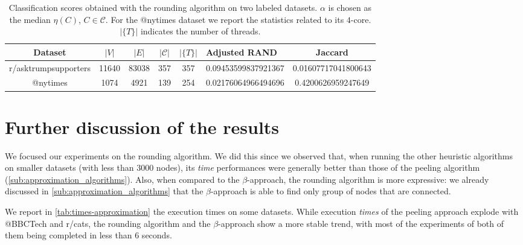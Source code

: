 \begin{table}
	\centering
	\caption{Classification scores obtained with the
		rounding algorithm on two labeled datasets. $\alpha $ is chosen as the
		median $\eta(C)$, $C \in
			\mathcal{C} $. For the @nytimes dataset we report the statistics
		related to its $4$-core. $|\{T\}|$ indicates the number of threads.}
	\label{tab:scores-datasets-labeled}
	{\small
		\begin{tabular}{|ccccc p{1.8cm} c|}
			\toprule
			Dataset              & $|V|$         & $|E|$                     & $|\mathcal{C}| $          &
			$|\{T\}| $           & Adjusted RAND & Jaccard                                                                                                            \\
			\midrule
			r/asktrumpsupporters & 11640         & 83038                     & 357
			                     & 357           & \num{0.09453599837921367} & \num{0.01607717041800643}                                                              \\
			@nytimes             & 1074          & 4921                      & 139                       & 254 & \num{0.02176064966494696} & \num{0.4200626959247649} \\
			\bottomrule
		\end{tabular}
	}
\end{table}

\section{Further discussion of the results}%
\label{sec:discussion}

We focused our experiments on the rounding algorithm. We did this
since we observed that, when running the other heuristic algorithms on smaller datasets
(with less than $3000$ nodes), its \emph{time} performances were generally better
than those of the peeling algorithm (\autoref{sub:approximation_algorithms}).
Also, when compared to the $\beta$-approach, the rounding algorithm is more
expressive: we already discussed in \autoref{sub:approximation_algorithms} that
the $\beta$-approach is able to find only group of nodes that are connected.

We report in \autoref{tab:times-approximation} the execution times on some
datasets. While execution \emph{times} of the peeling approach explode with
@BBCTech and r/cats, the rounding algorithm and the $\beta $-approach show a
more stable trend, with most of the experiments of both of them being completed
in less than $6$ seconds.

